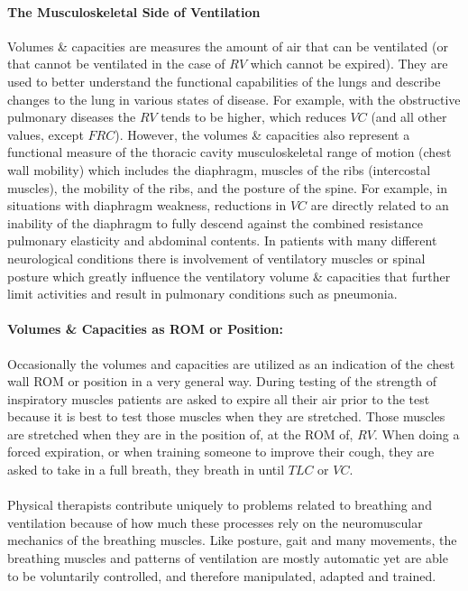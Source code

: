 \paragraph{The Musculoskeletal Side of Ventilation} Volumes \& capacities are measures the amount of air that can be ventilated (or that cannot be ventilated in the case of $RV$ which cannot be expired). They are used to better understand the functional capabilities of the lungs and describe changes to the lung in various states of disease. For example, with the obstructive pulmonary diseases the $RV$ tends to be higher, which reduces $VC$ (and all other values, except $FRC$). However, the volumes \& capacities also represent a functional measure of the thoracic cavity musculoskeletal range of motion (chest wall mobility) which includes the diaphragm, muscles of the ribs (intercostal muscles), the mobility of the ribs, and the posture of the spine. For example, in situations with diaphragm weakness, reductions in $VC$ are directly related to an inability of the diaphragm to fully descend against the combined resistance pulmonary elasticity and abdominal contents. In patients with many different neurological conditions there is involvement of ventilatory muscles or spinal posture which greatly influence the ventilatory volume \& capacities that further limit activities and result in pulmonary conditions such as pneumonia.

\paragraph{Volumes \& Capacities as ROM or Position:} Occasionally the volumes and capacities are utilized as an indication of the chest wall ROM or position in a very general way. During testing of the strength of inspiratory muscles patients are asked to expire all their air prior to the test because it is best to test those muscles when they are stretched. Those muscles are stretched when they are in the position of, at the ROM of, $RV$. When doing a forced expiration, or when training someone to improve their cough, they are asked to take in a full breath, they breath in until $TLC$ or $VC$. 

\paragraph{} Physical therapists contribute uniquely to problems related to breathing and ventilation because of how much these processes rely on the neuromuscular mechanics of the breathing muscles. Like posture, gait and many movements, the breathing muscles and patterns of ventilation are mostly automatic yet are able to be voluntarily controlled, and therefore manipulated, adapted and trained.

